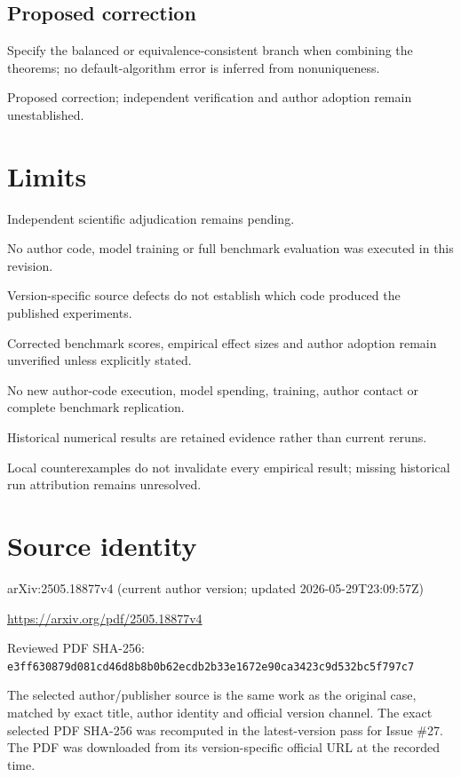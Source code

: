 \documentclass[11pt]{article}
\begin{document}
\subsection*{Proposed correction}

Specify the balanced or equivalence-consistent branch when combining the theorems; no default-algorithm error is inferred from nonuniqueness.

Proposed correction; independent verification and author adoption remain unestablished.

\section*{Limits}

Independent scientific adjudication remains pending.\par

No author code, model training or full benchmark evaluation was executed in this revision.\par

Version-specific source defects do not establish which code produced the published experiments.\par

Corrected benchmark scores, empirical effect sizes and author adoption remain unverified unless explicitly stated.\par

No new author-code execution, model spending, training, author contact or complete benchmark replication.\par

Historical numerical results are retained evidence rather than current reruns.\par

Local counterexamples do not invalidate every empirical result; missing historical run attribution remains unresolved.\par

\section*{Source identity}

arXiv:2505.18877v4 (current author version; updated 2026-05-29T23:09:57Z)

\url{https://arxiv.org/pdf/2505.18877v4}

Reviewed PDF SHA-256: \nolinkurl{e3ff630879d081cd46d8b8b0b62ecdb2b33e1672e90ca3423c9d532bc5f797c7}

The selected author/publisher source is the same work as the original case, matched by exact title, author identity and official version channel. The exact selected PDF SHA-256 was recomputed in the latest-version pass for Issue \#27. The PDF was downloaded from its version-specific official URL at the recorded time.
\end{document}
